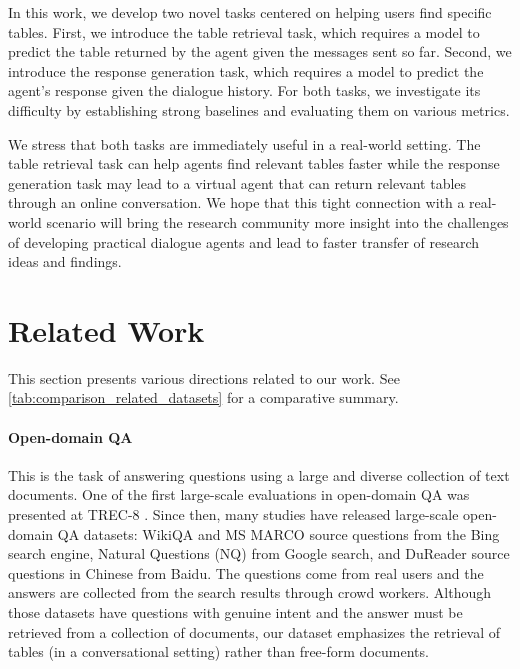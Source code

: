 \documentclass[11pt]{article}
\begin{document}
In this work, we develop two novel tasks centered on helping users find specific tables. First, we introduce the table retrieval task, which requires a model to predict the table returned by the agent given the messages sent so far. Second, we introduce the response generation task, which requires a model to predict the agent's response given the dialogue history. For both tasks, we investigate its difficulty by establishing strong baselines and evaluating them on various metrics.

We stress that both tasks are immediately useful in a real-world setting. The table retrieval task can help agents find relevant tables faster while the response generation task may lead to a virtual agent that can return relevant tables through an online conversation. We hope that this tight connection with a real-world scenario will bring the research community more insight into the challenges of developing practical dialogue agents and lead to faster transfer of research ideas and findings.  









\section{Related Work}
\label{sec:related_works}

This section presents various directions related to our work. See \autoref{tab:comparison_related_datasets} for a comparative summary.

\paragraph{Open-domain QA} This is the task of answering questions using a large and diverse collection of text documents. One of the first large-scale evaluations in open-domain QA was presented at TREC-8 \citep{voorhees_trec_2001}. Since then, many studies have released large-scale open-domain QA datasets: WikiQA \citep{yang_wikiqa_2015} and MS MARCO \cite{bajaj_ms_2018} source questions from the Bing search engine, Natural Questions (NQ) \citep{kwiatkowski_natural_2019} from Google search, and DuReader \citep{he_dureader_2018} source questions in Chinese from Baidu. The questions come from real users and the answers are collected from the search results through crowd workers. Although those datasets have questions with genuine intent and the answer must be retrieved from a collection of documents, our dataset emphasizes the retrieval of tables (in a conversational setting) rather than free-form documents.
\end{document}
